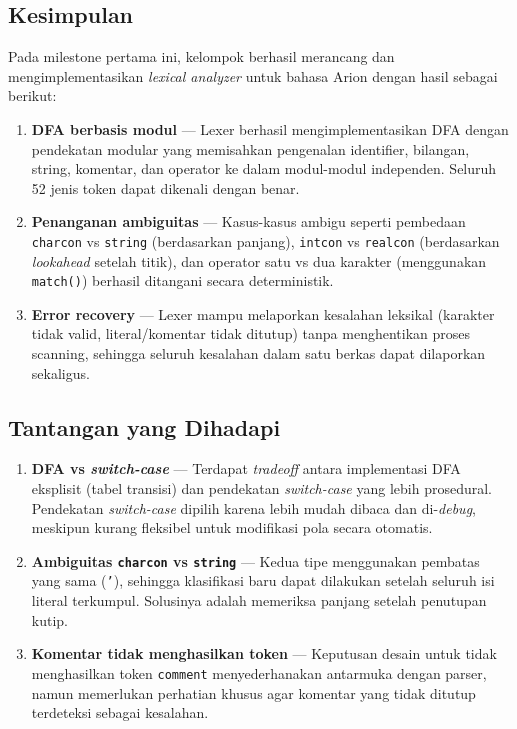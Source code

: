 \documentclass[12pt,a4paper]{article}
\begin{document}
\subsection{Kesimpulan}
Pada milestone pertama ini, kelompok berhasil merancang dan mengimplementasikan \textit{lexical analyzer} untuk bahasa Arion dengan hasil sebagai berikut:
\begin{enumerate}[label=\arabic*., leftmargin=2em]
  \item \textbf{DFA berbasis modul} --- Lexer berhasil mengimplementasikan DFA dengan pendekatan modular yang memisahkan pengenalan identifier, bilangan, string, komentar, dan operator ke dalam modul-modul independen. Seluruh 52 jenis token dapat dikenali dengan benar.
  \item \textbf{Penanganan ambiguitas} --- Kasus-kasus ambigu seperti pembedaan \texttt{charcon} vs \texttt{string} (berdasarkan panjang), \texttt{intcon} vs \texttt{realcon} (berdasarkan \textit{lookahead} setelah titik), dan operator satu vs dua karakter (menggunakan \texttt{match()}) berhasil ditangani secara deterministik.
  \item \textbf{Error recovery} --- Lexer mampu melaporkan kesalahan leksikal (karakter tidak valid, literal/komentar tidak ditutup) tanpa menghentikan proses scanning, sehingga seluruh kesalahan dalam satu berkas dapat dilaporkan sekaligus.
\end{enumerate}

\subsection{Tantangan yang Dihadapi}
\begin{enumerate}[label=\arabic*., leftmargin=2em]
  \item \textbf{DFA vs \textit{switch-case}} --- Terdapat \textit{tradeoff} antara implementasi DFA eksplisit (tabel transisi) dan pendekatan \textit{switch-case} yang lebih prosedural. Pendekatan \textit{switch-case} dipilih karena lebih mudah dibaca dan di-\textit{debug}, meskipun kurang fleksibel untuk modifikasi pola secara otomatis.
  \item \textbf{Ambiguitas \texttt{charcon} vs \texttt{string}} --- Kedua tipe menggunakan pembatas yang sama (\texttt{'}), sehingga klasifikasi baru dapat dilakukan setelah seluruh isi literal terkumpul. Solusinya adalah memeriksa panjang setelah penutupan kutip.
  \item \textbf{Komentar tidak menghasilkan token} --- Keputusan desain untuk tidak menghasilkan token \texttt{comment} menyederhanakan antarmuka dengan parser, namun memerlukan perhatian khusus agar komentar yang tidak ditutup terdeteksi sebagai kesalahan.
\end{enumerate}
\end{document}
